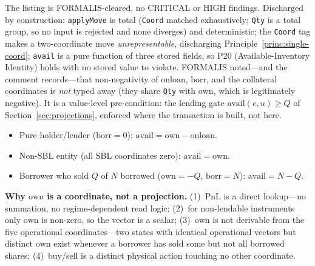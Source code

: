 \begin{remark}
The listing is FORMALIS-cleared, no CRITICAL or HIGH findings. Discharged by construction: \verb|applyMove| is total (\verb|Coord| matched exhaustively; \verb|Qty| is a total group, so no input is rejected and none diverges) and deterministic; the \verb|Coord| tag makes a two-coordinate move \emph{unrepresentable}, discharging Principle~\ref{princ:single-coord}; \verb|avail| is a pure function of three stored fields, so P20 (Available-Inventory Identity) holds with no stored value to violate. FORMALIS noted---and the comment records---that non-negativity of $\mathrm{onloan}$, $\mathrm{borr}$, and the collateral coordinates is \emph{not} typed away (they share \verb|Qty| with $\mathrm{own}$, which is legitimately negative). It is a value-level pre-condition: the lending gate $\mathrm{avail}(e,u)\geq Q$ of Section~\ref{sec:projections}, enforced where the transaction is built, not here.
\end{remark}

\begin{remark}
\hfill
\begin{itemize}[nosep]
\item Pure holder/lender ($\mathrm{borr}=0$): $\mathrm{avail} = \mathrm{own} - \mathrm{onloan}$.
\item Non-SBL entity (all SBL coordinates zero): $\mathrm{avail} = \mathrm{own}$.
\item Borrower who sold $Q$ of $N$ borrowed ($\mathrm{own}=-Q$, $\mathrm{borr}=N$): $\mathrm{avail} = N - Q$.
\end{itemize}
\end{remark}

\noindent\textbf{Why $\mathrm{own}$ is a coordinate, not a projection.} (1)~PnL is a direct lookup---no summation, no regime-dependent read logic; (2)~for non-lendable instruments only $\mathrm{own}$ is non-zero, so the vector is a scalar; (3)~$\mathrm{own}$ is not derivable from the five operational coordinates---two states with identical operational vectors but distinct $\mathrm{own}$ exist whenever a borrower has sold some but not all borrowed shares; (4)~buy/sell is a distinct physical action touching no other coordinate.


